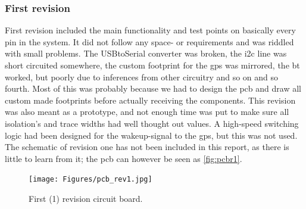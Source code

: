 \subsubsection{First revision}
First revision included the main functionality and test points on basically every pin in the system. It did not follow any space- or requirements and was riddled with small problems. The USBtoSerial converter was broken, the \gls{i2c} line was short circuited somewhere, the custom footprint for the \gls{gps} was mirrored, the \gls{bt} worked, but poorly due to inferences from other circuitry and so on and so fourth. Most of this was probably because we had to design the \gls{pcb} and draw all custom made footprints before actually receiving the components. This revision was also meant as a prototype, and not enough time was put to make sure all isolation's and trace widths had well thought out values. A high-speed switching logic had been designed for the wakeup-signal to the \gls{gps}, but this was not used. The schematic of revision one has not been included in this report, as there is little to learn from it; the \gls{pcb} can however be seen as \autoref{fig:pcbr1}.
\begin{figure}[H]
	\centering
    \texttt{[image: Figures/pcb\_rev1.jpg]}
	\caption{First (1) revision circuit board.}
	\label{fig:pcbr1}
\end{figure}

